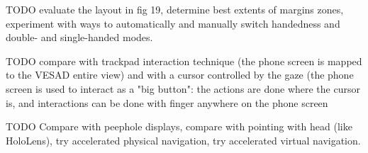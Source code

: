 TODO evaluate the layout in fig 19,
determine best extents of margins zones,
experiment with ways to automatically and manually switch handedness
and double- and single-handed modes.

TODO
compare  with trackpad interaction technique (the phone screen is mapped to the VESAD entire view) and with a cursor controlled by the gaze (the phone screen is used to interact as a "big button": the actions are done where the cursor is, and interactions can be done with finger anywhere on the phone screen

TODO
Compare with peephole displays,
compare with pointing with head (like HoloLens),
try accelerated physical navigation,
try accelerated virtual navigation.